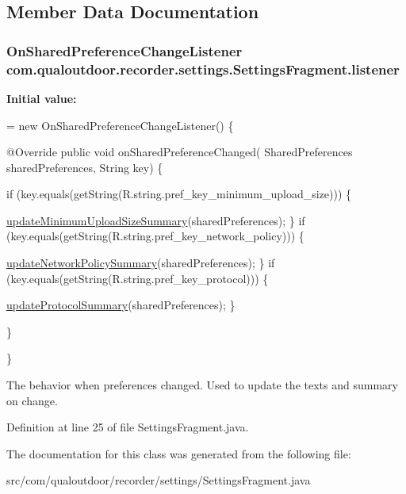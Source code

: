 \subsection{Member Data Documentation}
\hypertarget{classcom_1_1qualoutdoor_1_1recorder_1_1settings_1_1SettingsFragment_af4f15ade12aa826f88f38801736010f6}{
\subsubsection[{listener}]{\setlength{\rightskip}{0pt plus 5cm}On\-Shared\-Preference\-Change\-Listener com.\-qualoutdoor.\-recorder.\-settings.\-Settings\-Fragment.\-listener\hspace{0.3cm}{\ttfamily [private]}}}\label{classcom_1_1qualoutdoor_1_1recorder_1_1settings_1_1SettingsFragment_af4f15ade12aa826f88f38801736010f6}
{\bfseries Initial value\-:}
\begin{DoxyCode}
= \textcolor{keyword}{new} OnSharedPreferenceChangeListener() \{

        @Override
        \textcolor{keyword}{public} \textcolor{keywordtype}{void} onSharedPreferenceChanged(
                SharedPreferences sharedPreferences, String key) \{

            \textcolor{keywordflow}{if} (key.equals(getString(R.string.pref\_key\_minimum\_upload\_size))) \{
                
                \hyperlink{classcom_1_1qualoutdoor_1_1recorder_1_1settings_1_1SettingsFragment_a10c070e465872c5cdccf51c7bf975501}{updateMinimumUploadSizeSummary}(sharedPreferences);
            \}
            \textcolor{keywordflow}{if} (key.equals(getString(R.string.pref\_key\_network\_policy))) \{
                
                \hyperlink{classcom_1_1qualoutdoor_1_1recorder_1_1settings_1_1SettingsFragment_afa4141070c837fc5934be099fcb4ce20}{updateNetworkPolicySummary}(sharedPreferences);
            \}
            \textcolor{keywordflow}{if} (key.equals(getString(R.string.pref\_key\_protocol))) \{
                
                \hyperlink{classcom_1_1qualoutdoor_1_1recorder_1_1settings_1_1SettingsFragment_a224b8945815532c1943d515223816d95}{updateProtocolSummary}(sharedPreferences);
            \}

        \}

    \}
\end{DoxyCode}
The behavior when preferences changed. Used to update the texts and summary on change. 

Definition at line 25 of file Settings\-Fragment.\-java.



The documentation for this class was generated from the following file\-:\begin{DoxyCompactItemize}
\item 
src/com/qualoutdoor/recorder/settings/Settings\-Fragment.\-java\end{DoxyCompactItemize}
